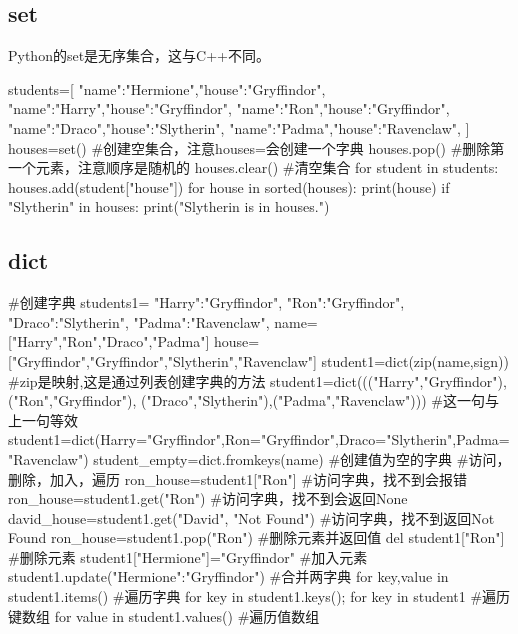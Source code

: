 \documentclass{article}
\begin{document}
    \subsection{set}
      Python的set是无序集合，这与C++不同。
      \begin{codeblock}[language=python, caption={basic operation of set}]
        students=[
          {"name":"Hermione","house":"Gryffindor"},
          {"name":"Harry","house":"Gryffindor"},
          {"name":"Ron","house":"Gryffindor"},
          {"name":"Draco","house":"Slytherin"},
          {"name":"Padma","house":"Ravenclaw"},
        ]
        houses=set() #创建空集合，注意houses={}会创建一个字典
        houses.pop() #删除第一个元素，注意顺序是随机的
        houses.clear() #清空集合
        for student in students:
          houses.add(student["house"])
        for house in sorted(houses):
          print(house)
        if "Slytherin" in houses:
          print("Slytherin is in houses.")
      \end{codeblock}


    \subsection{dict}
      \begin{codeblock}[language=python, caption={basic operation of dictionary}]
        #创建字典
        students1={
          "Harry":"Gryffindor",
          "Ron":"Gryffindor",
          "Draco":"Slytherin",
          "Padma":"Ravenclaw",
        }
        name=["Harry","Ron","Draco","Padma"]
        house=["Gryffindor","Gryffindor","Slytherin","Ravenclaw"]
        student1=dict(zip(name,sign)) #zip是映射,这是通过列表创建字典的方法
        student1=dict((("Harry","Gryffindor"),("Ron","Gryffindor"),
            ("Draco","Slytherin"),("Padma","Ravenclaw"))) #这一句与上一句等效
        student1=dict(Harry="Gryffindor",Ron="Gryffindor",Draco="Slytherin",Padma="Ravenclaw")
        student_empty=dict.fromkeys(name) #创建值为空的字典
        #访问，删除，加入，遍历
        ron_house=student1["Ron"] #访问字典，找不到会报错
        ron_house=student1.get("Ron") #访问字典，找不到会返回None
        david_house=student1.get("David", "Not Found") #访问字典，找不到返回Not Found
        ron_house=student1.pop("Ron") #删除元素并返回值
        del student1["Ron"] #删除元素
        student1["Hermione"]="Gryffindor" #加入元素
        student1.update({"Hermione":"Gryffindor"}) #合并两字典
        for key,value in student1.items() #遍历字典
        for key in student1.keys(); for key in student1 #遍历键数组
        for value in student1.values() #遍历值数组
      \end{codeblock}
\end{document}
